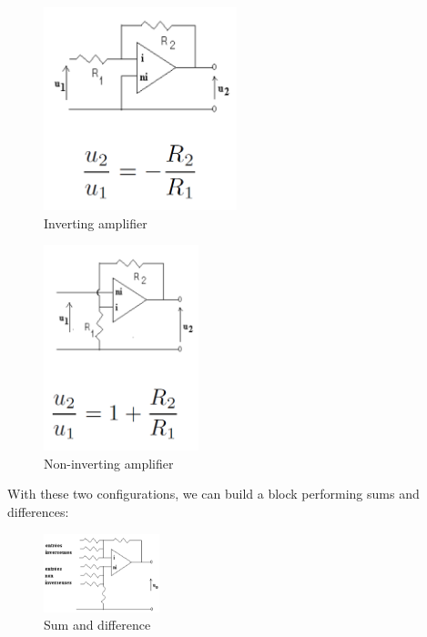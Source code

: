 \begin{minipage}[c]{.45\linewidth}	  
\begin{figure}[H]
    \centering
    \includegraphics[width = 0.5\textwidth]{L4/img/inverting.PNG}
    \caption{Inverting amplifier}
\end{figure}
\end{minipage} \hfill
\begin{minipage}[c]{.45\linewidth}
   \begin{figure}[H]
    \centering
    \includegraphics[width = 0.4\textwidth]{L4/img/non-inverting.PNG}
    \caption{Non-inverting amplifier}
\end{figure}
\end{minipage}

With these two configurations, we can build a block performing sums and differences:

\begin{figure}[H]
    \centering
    \includegraphics[width = 0.3\textwidth]{L4/img/sum-diff.PNG}
    \caption{Sum and difference}
\end{figure}

